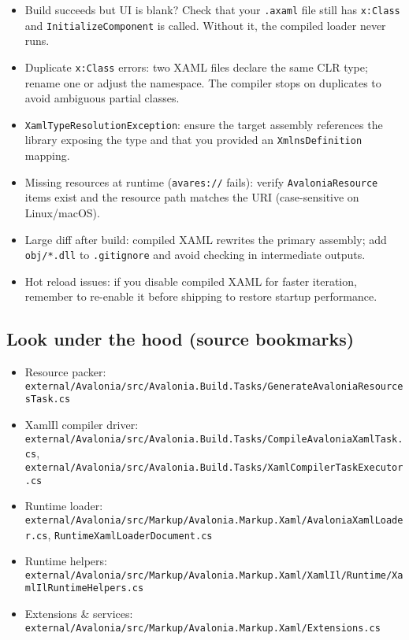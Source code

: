 \begin{itemize}
\tightlist
\item
  Build succeeds but UI is blank? Check that your
  \passthrough{\lstinline!.axaml!} file still has
  \passthrough{\lstinline!x:Class!} and
  \passthrough{\lstinline!InitializeComponent!} is called. Without it,
  the compiled loader never runs.
\item
  Duplicate \passthrough{\lstinline!x:Class!} errors: two XAML files
  declare the same CLR type; rename one or adjust the namespace. The
  compiler stops on duplicates to avoid ambiguous partial classes.
\item
  \passthrough{\lstinline!XamlTypeResolutionException!}: ensure the
  target assembly references the library exposing the type and that you
  provided an \passthrough{\lstinline!XmlnsDefinition!} mapping.
\item
  Missing resources at runtime (\passthrough{\lstinline!avares://!}
  fails): verify \passthrough{\lstinline!AvaloniaResource!} items exist
  and the resource path matches the URI (case-sensitive on Linux/macOS).
\item
  Large diff after build: compiled XAML rewrites the primary assembly;
  add \passthrough{\lstinline!obj/*.dll!} to
  \passthrough{\lstinline!.gitignore!} and avoid checking in
  intermediate outputs.
\item
  Hot reload issues: if you disable compiled XAML for faster iteration,
  remember to re-enable it before shipping to restore startup
  performance.
\end{itemize}

\subsection{Look under the hood (source
bookmarks)}\label{look-under-the-hood-source-bookmarks-27}

\begin{itemize}
\tightlist
\item
  Resource packer:
  \passthrough{\lstinline!external/Avalonia/src/Avalonia.Build.Tasks/GenerateAvaloniaResourcesTask.cs!}
\item
  XamlIl compiler driver:
  \passthrough{\lstinline!external/Avalonia/src/Avalonia.Build.Tasks/CompileAvaloniaXamlTask.cs!},
  \passthrough{\lstinline!external/Avalonia/src/Avalonia.Build.Tasks/XamlCompilerTaskExecutor.cs!}
\item
  Runtime loader:
  \passthrough{\lstinline!external/Avalonia/src/Markup/Avalonia.Markup.Xaml/AvaloniaXamlLoader.cs!},
  \passthrough{\lstinline!RuntimeXamlLoaderDocument.cs!}
\item
  Runtime helpers:
  \passthrough{\lstinline!external/Avalonia/src/Markup/Avalonia.Markup.Xaml/XamlIl/Runtime/XamlIlRuntimeHelpers.cs!}
\item
  Extensions \& services:
  \passthrough{\lstinline!external/Avalonia/src/Markup/Avalonia.Markup.Xaml/Extensions.cs!}
\end{itemize}


